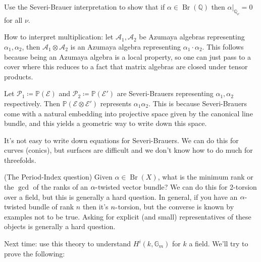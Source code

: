 \begin{exercise}[Fun!]

Use the Severi-Brauer interpretation to show that if
\(\alpha\in \operatorname{Br}({\mathbb{Q}})\) then
\({ \left.{{\alpha}} \right|_{{{\mathbb{Q}}_{\nu}}} } = 0\) for all
\(\nu\).

\end{exercise}

How to interpret multiplication: let
\(\mathcal{A}_{1}, \mathcal{A}_{2}\) be Azumaya algebras representing
\(\alpha_{1}, \alpha_{2}\), then
\(\mathcal{A}_{1} \otimes\mathcal{A}_{2}\) is an Azumaya algebra
representing \(\alpha_{1} \cdot \alpha_{2}\). This follows because being
an Azumaya algebra is a local property, so one can just pass to a cover
where this reduces to a fact that matrix algebras are closed under
tensor products.

Let \(\mathcal{P}_1 \coloneqq{\mathbb{P}}(\mathcal{E})\) and
\(\mathcal{P}_2 \coloneqq{\mathbb{P}}(\mathcal{E}')\) are Severi-Brauers
representing \(\alpha_1, \alpha_2\) respectively. Then
\({\mathbb{P}}(\mathcal{E} \otimes\mathcal{E}')\) represents
\(\alpha_1 \alpha_2\). This is because Severi-Brauers come with a
natural embedding into projective space given by the canonical line
bundle, and this yields a geometric way to write down this space.

\begin{question}

It's not easy to write down equations for Severi-Brauers. We can do this
for curves (conics), but surfaces are difficult and we don't know how to
do much for threefolds.

\end{question}

\begin{question}

(The Period-Index question) Given \(\alpha\in\operatorname{Br}(X)\),
what is the minimum rank or the \(\gcd\) of the ranks of an
\(\alpha{\hbox{-}}\)twisted vector bundle? We can do this for 2-torsion
over a field, but this is generally a hard question. In general, if you
have an \(\alpha{\hbox{-}}\)twisted bundle of rank \(n\) then it's
\(n{\hbox{-}}\)torsion, but the converse is known by examples not to be
true. Asking for explicit (and small) representatives of these objects
is generally a hard question.

\end{question}

Next time: use this theory to understand \(H^i(k, {\mathbb{G}}_m)\) for
\(k\) a field. We'll try to prove the following:

